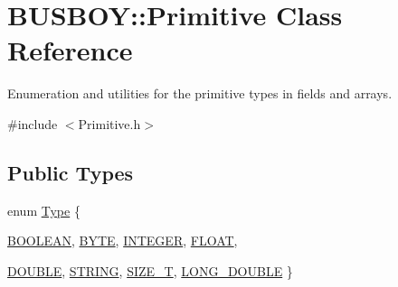 \hypertarget{classBUSBOY_1_1Primitive}{
\section{BUSBOY::Primitive Class Reference}
\label{classBUSBOY_1_1Primitive}
}


Enumeration and utilities for the primitive types in fields and arrays.  


{\ttfamily \#include $<$Primitive.h$>$}\subsection*{Public Types}
\begin{DoxyCompactItemize}
\item 
enum \hyperlink{classBUSBOY_1_1Primitive_afa08dc3cc68d2e851adafb0fc492cf15}{Type} \{ \par
\hyperlink{classBUSBOY_1_1Primitive_afa08dc3cc68d2e851adafb0fc492cf15a3385799f82b289e3784220eba12e417d}{BOOLEAN}, 
\hyperlink{classBUSBOY_1_1Primitive_afa08dc3cc68d2e851adafb0fc492cf15a6b725d22478832bc919c66177f140f40}{BYTE}, 
\hyperlink{classBUSBOY_1_1Primitive_afa08dc3cc68d2e851adafb0fc492cf15a55c56d6500265d9d68de140263375c23}{INTEGER}, 
\hyperlink{classBUSBOY_1_1Primitive_afa08dc3cc68d2e851adafb0fc492cf15ac44a0c65fc5519e875cee18e524de9de}{FLOAT}, 
\par
\hyperlink{classBUSBOY_1_1Primitive_afa08dc3cc68d2e851adafb0fc492cf15aaeb20f54c2339d133fee10fabe184a2f}{DOUBLE}, 
\hyperlink{classBUSBOY_1_1Primitive_afa08dc3cc68d2e851adafb0fc492cf15a087bfa8a3ba96f804a5f588e1ceb7a69}{STRING}, 
\hyperlink{classBUSBOY_1_1Primitive_afa08dc3cc68d2e851adafb0fc492cf15a2f7ce3fa59551e321daa60bf2b5f74bc}{SIZE\_\-T}, 
\hyperlink{classBUSBOY_1_1Primitive_afa08dc3cc68d2e851adafb0fc492cf15a619ade1bb4d6f4459a7df93c577607dd}{LONG\_\-DOUBLE}
 \}
\end{DoxyCompactItemize}
